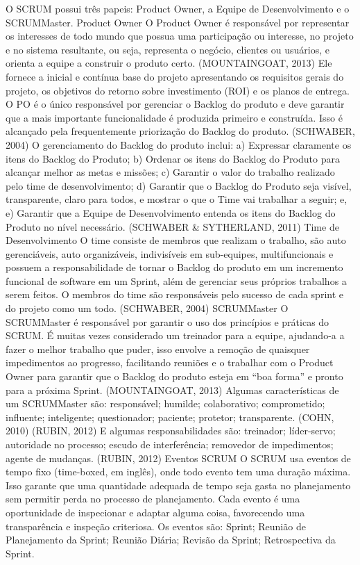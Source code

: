 O SCRUM possui três papeis: Product Owner, a Equipe de Desenvolvimento e o SCRUMMaster.
Product Owner
O Product Owner é responsável por representar os interesses de todo mundo que possua uma participação ou interesse, no projeto e no sistema resultante, ou seja, representa o negócio, clientes ou usuários, e orienta a equipe a construir o produto certo. (MOUNTAINGOAT, 2013) Ele fornece a inicial e contínua base do projeto apresentando os requisitos gerais do projeto, os objetivos do retorno sobre investimento (ROI) e os planos de entrega. O PO é o único responsável por gerenciar o Backlog do produto e deve garantir que a mais importante funcionalidade é produzida primeiro e construída. Isso é alcançado pela frequentemente priorização do Backlog do produto. (SCHWABER, 2004) 
O gerenciamento do Backlog do produto inclui: a) Expressar claramente os itens do Backlog do Produto; b) Ordenar os itens do Backlog do Produto para alcançar melhor as metas e missões; c) Garantir o valor do trabalho realizado pelo time de desenvolvimento; d) Garantir que o Backlog do Produto seja visível, transparente, claro para todos, e mostrar o que o Time vai trabalhar a seguir; e, e) Garantir que a Equipe de Desenvolvimento entenda os itens do Backlog do Produto no nível necessário. (SCHWABER & SYTHERLAND, 2011)
Time de Desenvolvimento
O time consiste de membros que realizam o trabalho, são auto gerenciáveis, auto organizáveis, indivisíveis em sub-equipes, multifuncionais e possuem a responsabilidade de tornar o Backlog do produto em um incremento funcional de software em um Sprint, além de gerenciar seus próprios trabalhos a serem feitos. O membros do time são responsáveis pelo sucesso de cada sprint e do projeto como um todo. (SCHWABER, 2004)
SCRUMMaster
O SCRUMMaster é responsável por garantir o uso dos princípios e práticas do SCRUM. É muitas vezes considerado um treinador para a equipe, ajudando-a a fazer o melhor trabalho que puder, isso envolve a remoção de quaisquer impedimentos ao progresso, facilitando reuniões e o trabalhar com o Product Owner para garantir que o Backlog do produto esteja em “boa forma” e pronto para a próxima Sprint. (MOUNTAINGOAT, 2013) Algumas características de um SCRUMMaster são: responsável; humilde; colaborativo; comprometido; influente; inteligente;  questionador; paciente; protetor; transparente. (COHN, 2010) (RUBIN, 2012) E algumas responsabilidades são: treinador; líder-servo; autoridade no processo; escudo de interferência; removedor de impedimentos; agente de mudanças. (RUBIN, 2012)
Eventos SCRUM
O SCRUM usa eventos de tempo fixo (time-boxed, em inglês), onde todo evento tem uma duração máxima. Isso garante que uma quantidade adequada de tempo seja gasta no planejamento sem permitir perda no processo de planejamento. Cada evento é uma oportunidade de inspecionar e adaptar alguma coisa, favorecendo uma transparência e inspeção criteriosa. Os eventos são: Sprint; Reunião de Planejamento da Sprint; Reunião Diária; Revisão da Sprint; Retrospectiva da Sprint.
